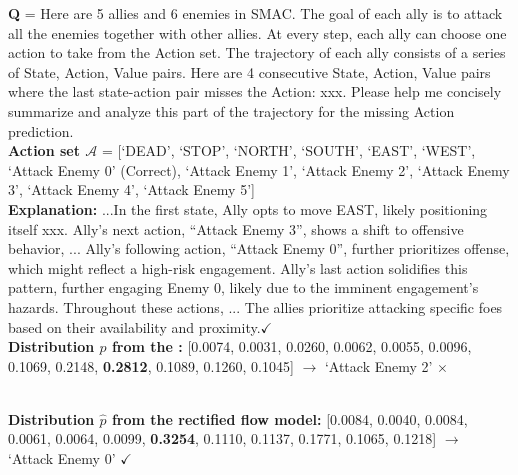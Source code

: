 
\begin{tcolorbox}[title=An example that a negative explanation classified
by the \rlm~is corrected by the rectified flow model $\varphi$ of on $\mathtt{SMAC}$]

    \textbf{Q} = Here are 5 allies and 6 enemies in SMAC. The goal of each ally is to attack all the enemies together with other allies. At every step, each ally can choose one action to take from the Action set. The trajectory of each ally consists of a series of State, Action, Value pairs. Here are 4 consecutive State, Action, Value pairs where the last state-action pair misses the Action: xxx. Please help me concisely summarize and analyze this part of the trajectory for the missing Action prediction.\\
    
    \textbf{Action set $\mathcal{A}$} = [`DEAD', `STOP', `NORTH', `SOUTH', `EAST', `WEST', \textcolor{outputcolor} {`Attack Enemy 0' (Correct)}, `Attack Enemy 1', `Attack Enemy 2', `Attack Enemy 3', `Attack Enemy 4', `Attack Enemy 5']\\
    
    \textbf{{Explanation:}} ...In the first state, Ally opts to move EAST, likely positioning itself xxx. Ally’s next action, “Attack Enemy 3”, shows a shift to offensive behavior, ... \textcolor{outputcolor}{Ally’s following action, “Attack Enemy 0”, further prioritizes offense, which might reflect a high-risk engagement. Ally’s last action solidifies this pattern, further engaging Enemy 0, likely due to the imminent engagement's hazards. Throughout these actions, ... The allies prioritize attacking specific foes based on their availability and proximity.$\checkmark$}  \\
    
    \textbf{{Distribution $p$ from the \rlm:}} [0.0074, 0.0031, 0.0260, 0.0062, 0.0055, 0.0096, 0.1069, 0.2148, \textbf{0.2812}, 0.1089, 0.1260, 0.1045] $\rightarrow$ `Attack Enemy 2’ {\color{red}$\boldsymbol{\times}$}\\\
    
    \textbf{{Distribution $\hat{p}$ from the rectified flow model:}} 
[0.0084, 0.0040, 0.0084, 0.0061, 0.0064, 0.0099, \textbf{0.3254}, 0.1110, 0.1137, 0.1771, 0.1065, 0.1218] $\rightarrow$ `Attack Enemy 0’ \textcolor{outputcolor} {$\checkmark$}\\

\end{tcolorbox}




